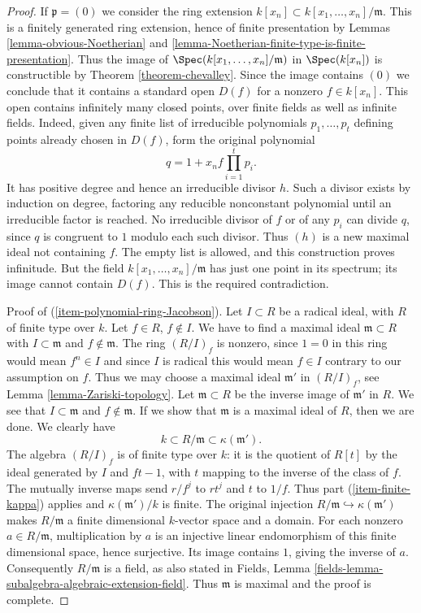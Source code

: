 \begin{proof}
\medskip\noindent
If $\mathfrak p = (0)$ we consider the ring
extension $k[x_n] \subset k[x_1, \ldots, x_n]/\mathfrak m$.
This is a finitely generated ring extension, hence
of finite presentation by
Lemmas \ref{lemma-obvious-Noetherian} and
\ref{lemma-Noetherian-finite-type-is-finite-presentation}.
Thus the image of $\Spec(k[x_1, \ldots, x_n]/\mathfrak m)$
in $\Spec(k[x_n])$ is constructible by
Theorem \ref{theorem-chevalley}. Since the image
contains $(0)$ we conclude that it contains a standard
open $D(f)$ for a nonzero $f\in k[x_n]$.
This open contains infinitely many closed points, over finite fields
as well as infinite fields. Indeed, given any finite list of
irreducible polynomials $p_1,\ldots,p_t$ defining points already
chosen in $D(f)$, form the original polynomial
$$
q=1+x_n f\prod_{i=1}^t p_i.
$$
It has positive degree and hence an irreducible divisor $h$.
Such a divisor exists by induction on degree, factoring any reducible
nonconstant polynomial until an irreducible factor is reached.
No irreducible divisor of $f$ or of any $p_i$ can divide $q$, since
$q$ is congruent to $1$ modulo each such divisor. Thus $(h)$ is a
new maximal ideal not containing $f$. The empty list is allowed,
and this construction proves infinitude. But the field
$k[x_1,\ldots,x_n]/\mathfrak m$ has just one point in its spectrum;
its image cannot contain $D(f)$. This is the required contradiction.

\medskip\noindent
Proof of (\ref{item-polynomial-ring-Jacobson}). Let
$I \subset R$ be a radical ideal, with $R$ of finite type over $k$.
Let $f \in R$, $f \not \in I$. We have to find a maximal ideal
$\mathfrak m \subset R$ with $I \subset \mathfrak m$ and
$f \not \in \mathfrak m$. The ring $(R/I)_f$ is nonzero, since
$1 = 0$ in this ring would mean $f^n \in I$ and since $I$ is
radical this would mean $f \in I$ contrary to our assumption on $f$.
Thus we may choose a maximal ideal $\mathfrak m'$
in $(R/I)_f$, see Lemma \ref{lemma-Zariski-topology}.
Let $\mathfrak m \subset R$
be the inverse image of $\mathfrak m'$ in $R$. We see that
$I \subset \mathfrak m$
and $f \not \in \mathfrak m$. If we show that $\mathfrak m$ is a maximal
ideal of $R$, then we are done. We clearly have
$$
k \subset R/\mathfrak m \subset \kappa(\mathfrak m').
$$
The algebra $(R/I)_f$ is of finite type over $k$: it is the quotient
of $R[t]$ by the ideal generated by $I$ and $ft-1$, with $t$ mapping
to the inverse of the class of $f$. The mutually inverse maps send
$r/f^j$ to $rt^j$ and $t$ to $1/f$.
Thus part (\ref{item-finite-kappa}) applies and
$\kappa(\mathfrak m')/k$ is finite. The original injection
$R/\mathfrak m\hookrightarrow\kappa(\mathfrak m')$ makes
$R/\mathfrak m$ a finite dimensional $k$-vector space and a domain.
For each nonzero $a\in R/\mathfrak m$, multiplication by $a$ is
an injective linear endomorphism of this finite dimensional space,
hence surjective. Its image contains $1$, giving the inverse of $a$.
Consequently $R/\mathfrak m$ is a field, as also stated in Fields,
Lemma \ref{fields-lemma-subalgebra-algebraic-extension-field}.
Thus $\mathfrak m$ is maximal and the proof is complete.
\end{proof}